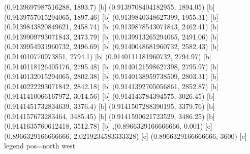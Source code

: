 {{{(0.9139697987516288, 1893.7) [b] 
(0.9139708404182955, 1894.05) [b] 
(0.9139757015294065, 1897.46) [b] 
(0.9139840348627399, 1955.31) [b] 
(0.9139843820849621, 2458.74) [b] 
(0.9139878543071843, 2462.41) [b] 
(0.9139909793071843, 2473.79) [b] 
(0.9139913265294065, 2491.06) [b] 
(0.9139954931960732, 2496.69) [b] 
(0.9140048681960732, 2582.43) [b] 
(0.914010770973851, 2794.1) [b] 
(0.9140111181960732, 2794.97) [b] 
(0.9140118126405176, 2795.48) [b] 
(0.9140121598627398, 2795.97) [b] 
(0.9140132015294065, 2802.38) [b] 
(0.9140138959738509, 2803.31) [b] 
(0.9140222293071842, 2842.18) [b] 
(0.9141392705056861, 2852.87) [b] 
(0.9141410066167972, 3014.56) [b] 
(0.914143784394575, 3026.45) [b] 
(0.9141451732834639, 3376.4) [b] 
(0.9141507288390195, 3379.76) [b] 
(0.914157673283464, 3485.45) [b] 
(0.9141590621723529, 3486.25) [b] 
(0.9141635760612418, 3512.78) [b] 
},{(0.8966329166666666, 0.001) [c] 
(0.8966329166666666, 2.0219234583333328) [c] 
(0.8966329166666666, 3600) [c] 
}}}{legend pos=north west}